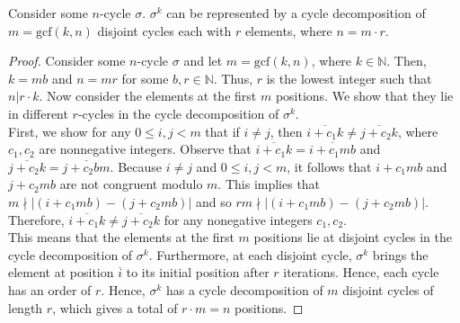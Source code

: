 \documentclass[12pt]{article}
\newcommand{\N}{\mathbb{N}}
\newenvironment{lemma}[2][Lemma]{\begin{trivlist} \item[\hskip \labelsep {\bfseries #1}\hskip \labelsep {\bfseries #2.}]}{\end{trivlist}}
\begin{document}
\begin{lemma}{A}
  Consider some $n$-cycle $\sigma$. $\sigma^{k}$ can be represented by a cycle decomposition of $m=\text{gcf}(k,n)$ disjoint cycles each with $r$ elements, where $n=m\cdot r$.
\begin{proof}
  Consider some $n$-cycle $\sigma$ and let $m=\text{gcf}(k,n)$, where $k\in \N$. Then, $k=mb$ and $n=mr$ for some $b,r\in\N$. Thus, $r$ is the lowest integer such that $n|r\cdot k$. Now consider the elements at the first $m$ positions. We show that they lie in different $r$-cycles in the cycle decomposition of $\sigma^{k}$. \\
  First, we show for any $0 \leq i,j < m$ that if $i\neq j$, then $\overline{i+c_{1}k} \neq \overline{j+c_{2}k}$, where $c_{1},c_{2}$ are nonnegative integers. Observe that $\overline{i+c_{1}k}=\overline{i+c_{1}mb}$ and $\overline{j+c_{2}k} = \overline{j+c_{2}bm}$. Because $i\neq j$ and $0\leq i,j<m$, it follows that $i+c_{1}mb$ and $j+c_{2}mb$ are not congruent modulo $m$. This implies that $m\nmid |(i+c_{1}mb)-(j+c_{2}mb)|$ and so $rm\nmid |(i+c_{1}mb)-(j+c_{2}mb)|$. Therefore, $\overline{i+c_{1}k}\neq \overline{j+c_{2}k}$ for any nonegative integers $c_{1},c_{2}$. \\
  This means that the elements at the first $m$ positions lie at disjoint cycles in the cycle decomposition of $\sigma^{k}$. Furthermore, at each disjoint cycle, $\sigma^{k}$ brings the element at position $\overline{i}$ to its initial position after $r$ iterations. Hence, each cycle has an order of $r$. Hence, $\sigma^{k}$ has a cycle decomposition of $m$ disjoint cycles of length $r$, which gives a total of $r\cdot m=n$ positions.  
\end{proof}
\end{lemma}
\end{document}
